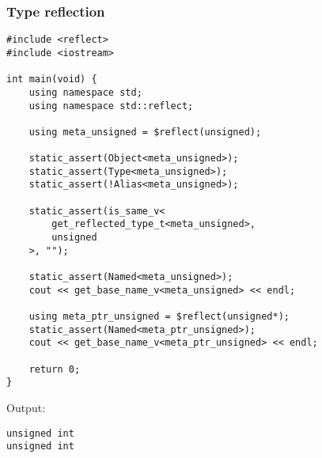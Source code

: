 \subsubsection{Type reflection}

\begin{verbatim}
#include <reflect>
#include <iostream>

int main(void) {
	using namespace std;
	using namespace std::reflect;

	using meta_unsigned = $reflect(unsigned);

	static_assert(Object<meta_unsigned>);
	static_assert(Type<meta_unsigned>);
	static_assert(!Alias<meta_unsigned>);

	static_assert(is_same_v<
		get_reflected_type_t<meta_unsigned>,
		unsigned
	>, "");

	static_assert(Named<meta_unsigned>);
	cout << get_base_name_v<meta_unsigned> << endl;

	using meta_ptr_unsigned = $reflect(unsigned*);
	static_assert(Named<meta_ptr_unsigned>);
	cout << get_base_name_v<meta_ptr_unsigned> << endl;

	return 0;
}
\end{verbatim}

Output:

\begin{verbatim}
unsigned int
unsigned int
\end{verbatim}

